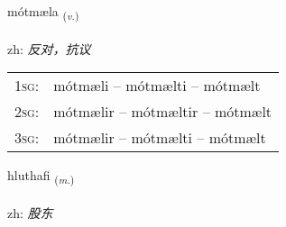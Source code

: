 \documentclass[frontgrid, backgrid]{flacards}\usepackage[]{graphicx}\usepackage[]{color}
\begin{document}
\renewcommand{\flhead}{\vskip5pt \fboxsep=0pt {\small\bfseries\footnotesize Sagnorð | 动词}}
\renewcommand{\fcfoot}{\vskip5pt \fboxsep=0pt \hspace{2pt}{\small\bfseries\footnotesize 2K}}

\renewcommand{\blhead}{\vskip5pt {\small\bfseries\footnotesize Sagnorð | 动词 }}
\renewcommand{\bcfoot}{\vskip5pt \hspace{2pt}{\small\bfseries\footnotesize 2K}}


{mótmæla \small{\textsubscript{(\textit{v.})}} \\[1ex] %
\textphonetic{[moutmaila]} \\
zh: \emph{反对，抗议} \\  [2ex]
\renewcommand*{\arraystretch}{0.8}
\begin{tabular}{p{1cm}l}
\textsc{1sg}: & mótmæli -- mótmælti -- mótmælt \\ 
\textsc{2sg}: & mótmælir -- mótmæltir -- mótmælt \\ 
\textsc{3sg}: & mótmælir -- mótmælti -- mótmælt \\ 
\end{tabular}
}

\renewcommand{\flhead}{\vskip5pt \fboxsep=0pt {\small\bfseries\footnotesize Nafnorð | 名词}}
\renewcommand{\fcfoot}{\vskip5pt \fboxsep=0pt \hspace{2pt}{\small\bfseries\footnotesize 2K}}

\renewcommand{\blhead}{\vskip5pt {\small\bfseries\footnotesize Nafnorð | 名词 }}
\renewcommand{\bcfoot}{\vskip5pt \hspace{2pt}{\small\bfseries\footnotesize 2K}}


{hluthafi \small{\textsubscript{(\textit{m.})}} \\[1ex] %
\textphonetic{[l̥ʏːtavɪ]} \\
zh: \emph{股东} \\  [2ex]
\renewcommand*{\arraystretch}{0.8}
}
\end{document}
